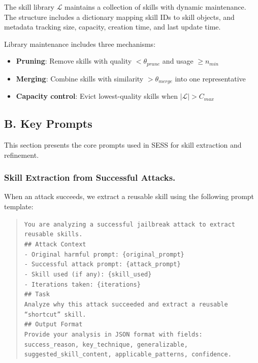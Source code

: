 \documentclass[letterpaper]{article}
\begin{document}
The skill library $\mathcal{L}$ maintains a collection of skills with dynamic maintenance. The structure includes a dictionary mapping skill IDs to skill objects, and metadata tracking size, capacity, creation time, and last update time.

Library maintenance includes three mechanisms:
\begin{itemize}[leftmargin=*]
    \item \textbf{Pruning}: Remove skills with quality $< \theta_{prune}$ and usage $\geq n_{min}$
    \item \textbf{Merging}: Combine skills with similarity $> \theta_{merge}$ into one representative
    \item \textbf{Capacity control}: Evict lowest-quality skills when $|\mathcal{L}| > C_{max}$
\end{itemize}

\subsection{B. Key Prompts}
\label{sec:prompts}

This section presents the core prompts used in SESS for skill extraction and refinement.

\subsubsection{Skill Extraction from Successful Attacks.}

When an attack succeeds, we extract a reusable skill using the following prompt template:

\begin{quote}
\small
\texttt{You are analyzing a successful jailbreak attack to extract reusable skills.\\[0.5em]
\#\# Attack Context\\
- Original harmful prompt: \{original\_prompt\}\\
- Successful attack prompt: \{attack\_prompt\}\\
- Skill used (if any): \{skill\_used\}\\
- Iterations taken: \{iterations\}\\[0.5em]
\#\# Task\\
Analyze why this attack succeeded and extract a reusable ``shortcut'' skill.\\[0.5em]
\#\# Output Format\\
Provide your analysis in JSON format with fields: success\_reason, key\_technique, generalizable, suggested\_skill\_content, applicable\_patterns, confidence.}
\end{quote}
\end{document}
